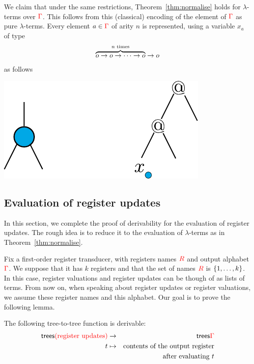 We claim that under the same restrictions, Theorem~\ref{thm:normalise} holds for $\lambda$-terms over ${\color{red}{\Gamma}}$. This follows from this (classical) encoding of the element of ${\color{red}{\Gamma}}$ as pure $\lambda$-terms. 
Every element  $a \in {\color{red}{\Gamma}}$ of arity $n$ is represented, using  a variable $x_a$ of type 
\begin{align}
\overbrace{o \to o \to \cdots \to o}^{\text{$n$ times}} \to o
\end{align}
as follows
\begin{center}
\includegraphics[scale=.4]{pictures/encode-gamma}
\end{center}
\subsection{Evaluation of register updates}
\label{sec:updates-endgame}
In this section, we complete the proof of derivability for the evaluation of register updates. The rough idea is to reduce it to the evaluation of $\lambda$-terms as in Theorem~\ref{thm:normalise}. %

Fix a first-order register transducer, with registers names ${{\color{red}{R}}}$ and output alphabet ${\color{red}{\Gamma}}$. We suppose that it has $k$ registers and that the set of names ${{\color{red}{R}}}$ is $\{1,\dots,k\}$. In this case, register valuations and register updates can be though of as lists of terms. 
From now on, when speaking about register updates or register valuations, we assume these register names and this alphabet. Our goal is to prove the following lemma. 
\begin{lemma}\label{lem:derive-register-updates}
    The  following tree-to-tree function  is derivable:
    \begin{eqnarray*}
    \mathsf {trees}{{\color{red}{\text{(register updates)}}}} &\to & \mathsf {trees} {\color{red}{\Gamma}} \\
    t & \mapsto & \text{contents of the output register}\\
    && \text{after evaluating $t$}
    \end{eqnarray*}    
\end{lemma}

